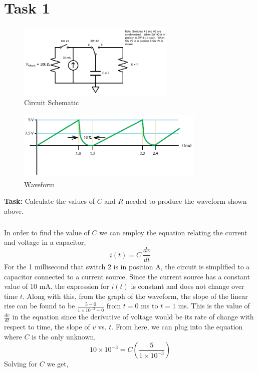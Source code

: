 \documentclass[12pt]{article}
\begin{document}
    \section*{Task 1}
    \begin{figure}[h]
        \centering
        \includegraphics[width=0.67\textwidth]{Task 1 Schematic.png}
        \caption{Circuit Schematic}
    \end{figure}
    \begin{figure}[h]
        \centering
        \includegraphics[width=0.8\textwidth]{Task 1 Waveform.png}
        \caption{Waveform}
    \end{figure}
    \textbf{Task:} Calculate the values of $C$ and $R$ needed to produce
    the waveform shown above.
    \subparagraph*{} In order to find the value of $C$ we can employ the equation relating
    the current and voltage in a capacitor,
    \[
        i(t) = C\ \frac{dv}{dt}
    \]
    For the 1 millisecond that switch 2 is in position A, the circuit is
    simplified to a capacitor connected to a current source.  Since the current
    source has a constant value of 10 mA, the expression for $i(t)$ is constant
    and does not change over time $t$. Along with this, from the graph of the
    waveform, the slope of the linear rise can be found to be $\frac{5 - 0}{1
    \times 10^{-3} - 0}$ from $t=0$ ms to $t=1$ ms. This is the value of
    $\frac{dv}{dt}$ in the equation since the derivative of voltage would be its
    rate of change with respect to time, the slope of $v$ vs. $t$.  From here,
    we can plug into the equation where $C$ is the only unknown,
    \[
        10 \times 10^{-3} = C \left( \frac{5}{1 \times 10^{-3}} \right)
    \]
    Solving for $C$ we get,
\end{document}
